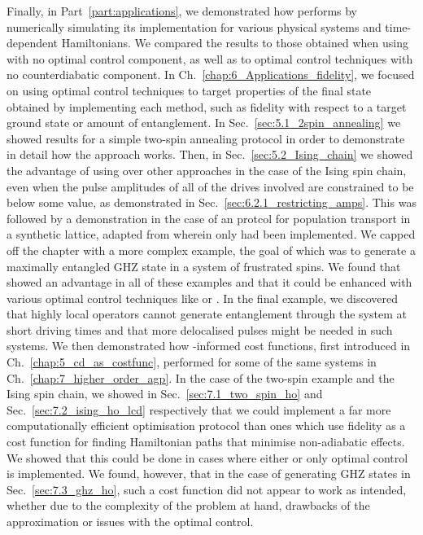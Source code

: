 Finally, in Part~\ref{part:applications}, we demonstrated how  performs by numerically simulating its implementation for various physical systems and time-dependent Hamiltonians. We compared the results to those obtained when using  with no optimal control component, as well as to optimal control techniques with no counterdiabatic component. In Ch.~\ref{chap:6_Applications_fidelity}, we focused on using optimal control techniques to target properties of the final state obtained by implementing each method, such as fidelity with respect to a target ground state or amount of entanglement. In Sec.~\ref{sec:5.1_2spin_annealing} we showed results for a simple two-spin annealing protocol in order to demonstrate in detail how the  approach works. Then, in Sec.~\ref{sec:5.2_Ising_chain} we showed the advantage of using  over other approaches in the case of the Ising spin chain, even when the pulse amplitudes of all of the drives involved are constrained to be below some value, as demonstrated in Sec.~\ref{sec:6.2.1_restricting_amps}. This was followed by a demonstration in the case of an  protcol for population transport in a synthetic lattice, adapted from \cite{meier_counterdiabatic_2020} wherein only  had been implemented. We capped off the chapter with a more complex example, the goal of which was to generate a maximally entangled GHZ state in a system of frustrated spins. We found that  showed an advantage in all of these examples and that it could be enhanced with various optimal control techniques like  or . In the final example, we discovered that highly local  operators cannot generate entanglement through the system at short driving times and that more delocalised pulses might be needed in such systems. We then demonstrated how -informed cost functions, first introduced in Ch.~\ref{chap:5_cd_as_costfunc}, performed for some of the same systems in Ch.~\ref{chap:7_higher_order_agp}. In the case of the two-spin example and the Ising spin chain, we showed in Sec.~\ref{sec:7.1_two_spin_ho} and Sec.~\ref{sec:7.2_ising_ho_lcd} respectively that we could implement a far more computationally efficient optimisation protocol than ones which use fidelity as a cost function for finding Hamiltonian paths that minimise non-adiabatic effects. We showed that this could be done in cases where either  or only optimal control is implemented. We found, however, that in the case of generating GHZ states in Sec.~\ref{sec:7.3_ghz_ho}, such a cost function did not appear to work as intended, whether due to the complexity of the problem at hand, drawbacks of the  approximation or issues with the optimal control. 

